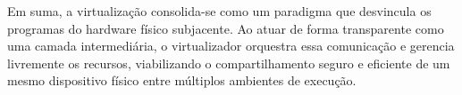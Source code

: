 Em suma, a virtualização consolida-se como um paradigma que desvincula os programas do hardware físico subjacente. Ao atuar de forma transparente como uma camada intermediária,
o virtualizador orquestra essa comunicação e gerencia livremente os recursos, viabilizando o compartilhamento seguro e eficiente de um mesmo dispositivo físico entre múltiplos
ambientes de execução.
